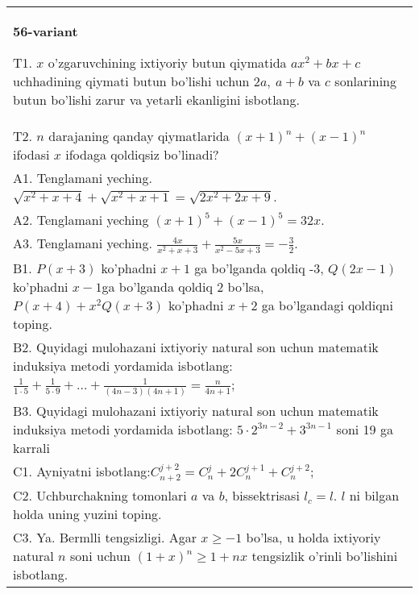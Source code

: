 \documentclass{article}
\begin{document}
\begin{tabular}{m{17cm}}
\textbf{56-variant}
\newline

T1. \(x\) o'zgaruvchining ixtiyoriy butun qiymatida \(ax^{2} + bx + c\) uchhadining qiymati butun bo'lishi uchun \(2a,\ a + b\) va \(c\) sonlarining butun bo'lishi zarur va yetarli ekanligini isbotlang. \\
T2. \(n\) darajaning qanday qiymatlarida \((x + 1)^{n} + (x - 1)^{n}\) ifodasi \(x\) ifodaga qoldiqsiz bo'linadi? \\
A1. Tenglamani yeching. \(\sqrt{x^{2} + x + 4} + \sqrt{x^{2} + x + 1} = \sqrt{2x^{2} + 2x + 9}\). \\
A2. Tenglamani yeching \((x + 1)^{5} + (x - 1)^{5} = 32x\). \\
A3. Tenglamani yeching. \(\frac{4x}{x^{2} + x + 3} + \frac{5x}{x^{2} - 5x + 3} = - \frac{3}{2}\). \\
B1. \(P(x + 3)\) ko'phadni \(x + 1\) ga bo'lganda qoldiq -3, \(Q(2x - 1)\) ko'phadni \(x - 1\)ga bo'lganda qoldiq 2 bo'lsa, \(P(x + 4) + x^{2}Q(x + 3)\) ko'phadni \(x + 2\) ga bo'lgandagi qoldiqni toping. \\
B2. Quyidagi mulohazani ixtiyoriy natural son uchun matematik induksiya metodi yordamida isbotlang: \(\frac{1}{1 \cdot 5} + \frac{1}{5 \cdot 9} + ... + \frac{1}{(4n - 3)(4n + 1)} = \frac{n}{4n + 1}\); \\
B3. Quyidagi mulohazani ixtiyoriy natural son uchun matematik induksiya metodi yordamida isbotlang: \(5 \cdot 2^{3n - 2} + 3^{3n - 1}\) soni 19 ga karrali \\
C1. Ayniyatni isbotlang:\(C_{n + 2}^{j + 2} = C_{n}^{j} + 2C_{n}^{j + 1} + C_{n}^{j + 2}\); \\
C2. Uchburchakning tomonlari \(a\) va \(b\), bissektrisasi \(l_{c} = l\). \(l\) ni bilgan holda uning yuzini toping. \\
C3. Ya. Bermlli tengsizligi. Agar \(x \geq - 1\) bo'lsa, u holda ixtiyoriy natural \(n\) soni uchun \((1 + x)^{n} \geq 1 + nx\) tengsizlik o'rinli bo'lishini isbotlang. \\

\end{tabular}
\vspace{1cm}
\end{document}
